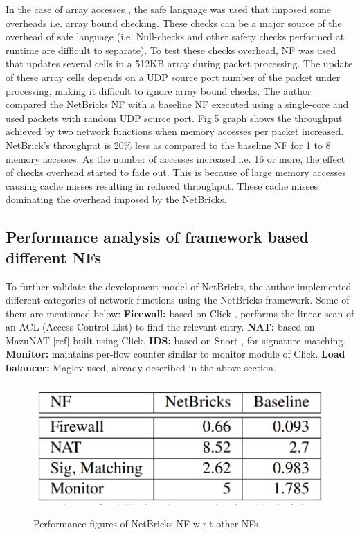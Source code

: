 \documentclass[10pt, a4paper, conference]{IEEEtran}
\begin{document}
In the case of array accesses \cite{Panda2016}, the safe language was used that imposed some overheads i.e. array bound checking. These checks can be a major source of the overhead of safe language (i.e. Null-checks and other safety checks performed at runtime are difficult to separate). To test these checks overhead, NF was used that updates several cells in a 512KB array during packet processing. The update of these array cells depends on a UDP source port number of the packet under processing, making it difficult to ignore array bound checks. The author compared the NetBricks NF with a baseline NF executed using a single-core and used packets with random UDP source port. Fig.5 graph shows the throughput achieved by two network functions when memory accesses per packet increased. NetBrick’s throughput is 20\% less as compared to the baseline NF for 1 to 8 memory accesses. As the number of accesses increased i.e. 16 or more, the effect of checks overhead started to fade out. This is because of large memory accesses causing cache misses resulting in reduced throughput. These cache misses dominating the overhead imposed by the NetBricks.    


\subsection{Performance analysis of framework based different NFs}
To further validate the development model of NetBricks, the author implemented different categories of network functions using the NetBricks framework. Some of them are mentioned below\cite{Panda2016}:
\newline
\textbf{Firewall:} based on Click \cite{Martins2014}, performs the linear scan of an ACL (Access Control List) to find the relevant entry.
\newline
\textbf{NAT:} based on MazuNAT [ref] built using Click.
\newline
\textbf{IDS:} based on Snort \cite{Roesch}, for signature matching.
\newline
\textbf{Monitor:} maintains per-flow counter similar to monitor module of Click.
\newline
\textbf{Load balancer:} Maglev used, already described in the above section.
\begin{figure}
	\centering
	\includegraphics[width=\linewidth]{figures/tab1}
	\caption{Performance figures of NetBricks NF w.r.t other NFs}
	\cite{Panda2016}
	\label{key6}
\end{figure}
\end{document}
